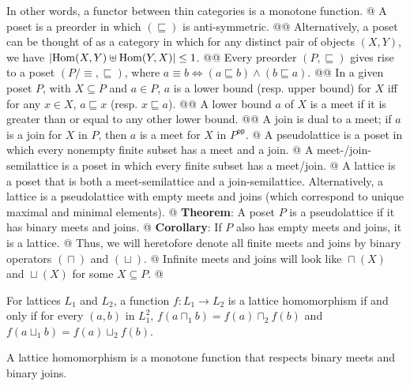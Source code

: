 \documentclass[]{article}
\DeclarePairedDelimiter{\abs}{\lvert}{\rvert}
\newcommand{\textbs}[1]{{\sffamily\fontseries{sbc}\selectfont #1}}
\newcommand{\join}[0]{\ensuremath{\mathrel{\sqcup}}}
\newcommand{\meet}[0]{\ensuremath{\mathrel{\sqcap}}}
\newcommand{\poset}[0]{\ensuremath{\mathrel{\sqsubseteq}}}
\newcommand{\opcat}[1]{\ensuremath{{#1}^{\mathsf{op}}}}
\DeclareMathOperator{\homset}{Hom}
\newcommand{\define}[1]{\textbs{#1}}
\begin{document}
\begin{easylist}[itemize]
{  In other words, a functor between thin categories is a monotone function.
}
@ A \define{poset} is a preorder in which $(\poset)$ is anti-symmetric.
@@ {%
  Alternatively, a poset can be thought of as a category in which for any
  distinct pair of objects $(X, Y)$, we have
  $\abs{\homset(X, Y) \uplus \homset(Y, X)} \le 1$.
}
@@ {%
  Every preorder $(P, \poset)$ gives rise to a poset $(P / {\equiv}, \poset)$,
  where $a \equiv b \iff (a \poset b) \land (b \poset a)$.
}
@@ {%
  In a given poset $P$, with $X \subseteq P$ and $a \in P$, $a$ is a
  \define{lower bound} (resp. \define{upper bound}) for $X$ iff for any
  $x \in X$, $a \poset x$ (resp. $x \poset a$).
}
@@ {%
  A lower bound $a$ of $X$ is a \define{meet} if it is greater than or equal to
  any other lower bound.
}
@@ {%
  A \define{join} is dual to a meet; if $a$ is a join for $X$ in $P$, then
  $a$ is a meet for $X$ in $\opcat{P}$.
}
@ {%
  A \define{pseudolattice} is a poset in which every nonempty finite subset has
  a meet and a join.
}
@ {%
  A \define{meet-/join-semilattice} is a poset in which every finite subset
  has a meet/join.
}
@ {%
  A \define{lattice} is a poset that is both a meet-semilattice and a
  join-semilattice. Alternatively, a lattice is a pseudolattice with empty meets
  and joins (which correspond to unique maximal and minimal elements).
}
@ {%
  \textbf{Theorem}:
  A poset $P$ is a pseudolattice if it has binary meets and joins.
}
@ {%
  \textbf{Corollary}:
  If $P$ also has empty meets and joins, it is a lattice.
}
@ {%
  Thus, we will heretofore denote all finite meets and joins by binary operators
  $(\meet)$ and $(\join)$.
}
@ {%
  Infinite meets and joins will look like ${\meet}(X)$ and ${\join}(X)$
  for some $X \subseteq P$.
}
@ {%
  For lattices $L_1$ and $L_2$, a function $f : L_1 \to L_2$ is a
  \define{lattice homomorphism} if and only if for every $(a, b)$ in $L_1^2$,
  $f(a \meet_1 b) = f(a) \meet_2 f(b)$ and $f(a \join_1 b) = f(a) \join_2 f(b)$.

  A lattice homomorphism is a monotone function that respects binary meets
  and binary joins.

}
\end{easylist}
\end{document}
